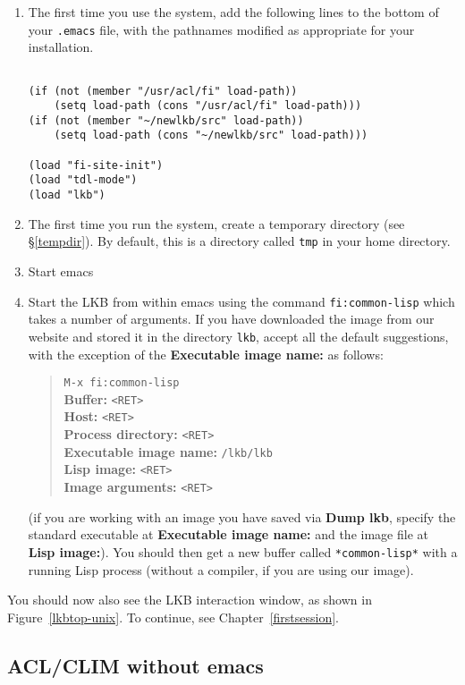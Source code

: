 \documentclass[12pt]{report}
\begin{document}
\begin{enumerate}
\item The first time you use the system,
add the following lines to the bottom of your {\tt .emacs}
file, with the pathnames modified as appropriate for your
installation.
\begin{verbatim}

(if (not (member "/usr/acl/fi" load-path))
    (setq load-path (cons "/usr/acl/fi" load-path)))
(if (not (member "~/newlkb/src" load-path))
    (setq load-path (cons "~/newlkb/src" load-path)))
	
(load "fi-site-init")
(load "tdl-mode")
(load "lkb")
\end{verbatim}
\item The first time you run the system,
create a temporary directory (see \S\ref{tempdir}).  By default, this is
a directory called {\tt tmp} in your home directory.
\item Start emacs
\item Start the LKB from within emacs using the 
command \verb+fi:common-lisp+ which takes a number
of arguments.  If you have downloaded the image from our website
and stored it in the directory {\tt lkb}, accept all the default
suggestions, with the exception of the {\bf Executable image name:}
as follows:
\begin{quote}
\verb+M-x fi:common-lisp+\\
{\bf Buffer:} \verb+<RET>+\\
{\bf Host:} \verb+<RET>+\\
{\bf Process directory:} \verb+<RET>+\\
{\bf Executable image name:} \verb+/lkb/lkb+\\
{\bf Lisp image:}  \verb+<RET>+\\
{\bf Image arguments:}  \verb+<RET>+
\end{quote}
(if you are working with an image you have saved via {\bf Dump lkb}, 
specify the standard executable at
{\bf Executable image name:} and the image file at {\bf Lisp image:}).
You should then get a new buffer called \verb+*common-lisp*+ with
a running Lisp process (without a compiler, if you are using our
image).
\end{enumerate}
You
should now also see the LKB interaction window, as shown in 
Figure~\ref{lkbtop-unix}.
To continue, see Chapter~\ref{firstsession}.


\subsection{ACL/CLIM without emacs}
\label{clim-image}
\end{document}
